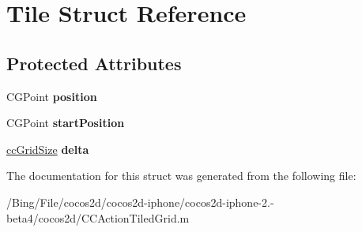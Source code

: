 \hypertarget{struct_tile}{\section{Tile Struct Reference}
\label{struct_tile}
}
\subsection*{Protected Attributes}
\begin{DoxyCompactItemize}
\item 
\hypertarget{struct_tile_a8fa86706fdbfa1eb4698946c9acb35a7}{C\-G\-Point {\bfseries position}}\label{struct_tile_a8fa86706fdbfa1eb4698946c9acb35a7}

\item 
\hypertarget{struct_tile_ab623d58be473d7e0889576f707279346}{C\-G\-Point {\bfseries start\-Position}}\label{struct_tile_ab623d58be473d7e0889576f707279346}

\item 
\hypertarget{struct_tile_a2894b204a30edfb9145ffcfeeff6e7b3}{\hyperlink{cc_types_8h_a66489f5c8efbdb2aa26ecbf9184ec8ea}{cc\-Grid\-Size} {\bfseries delta}}\label{struct_tile_a2894b204a30edfb9145ffcfeeff6e7b3}

\end{DoxyCompactItemize}


The documentation for this struct was generated from the following file\-:\begin{DoxyCompactItemize}
\item 
/\-Bing/\-File/cocos2d/cocos2d-\/iphone/cocos2d-\/iphone-\/2.-\/beta4/cocos2d/C\-C\-Action\-Tiled\-Grid.\-m\end{DoxyCompactItemize}
